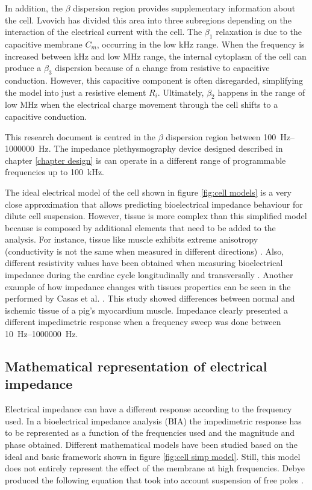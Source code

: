 In addition, the $\beta$ dispersion region provides supplementary information about the cell. Lvovich \cite{lvovich2012impedance} has divided this area into three subregions depending on the interaction of the electrical current with the cell. The $\beta_1$ relaxation is due to the capacitive membrane $C_m$, occurring in the low \si{\kilo\hertz} range. When the frequency is increased between \si{\kilo\hertz} and low \si{\mega\hertz} range, the internal cytoplasm of the cell can produce a $\beta_3$ dispersion because of a change from resistive to capacitive conduction. However, this capacitive component is often disregarded, simplifying the model into just a resistive element $R_i$. Ultimately, $\beta_2$ happens in the range of low \si{\mega\hertz} when the electrical charge movement through the cell shifts to a capacitive conduction.

This research document is centred in the $\beta$ dispersion region between \SIrange[scientific-notation = engineering]{100}{1000000}{\hertz}. The impedance plethysmography device designed described in chapter \ref{chapter design} is can operate in a different range of programmable frequencies up to \SI{100}{\kHz}. 

The ideal electrical model of the cell shown in figure \ref{fig:cell models} is a very close approximation that allows predicting bioelectrical impedance behaviour for dilute cell suspension. However, tissue is more complex than this simplified model because is composed by additional elements that need to be added to the analysis. For instance, tissue like muscle exhibits extreme anisotropy (conductivity is not the same when measured in different directions) \cite{lvovich2012impedance,dean2008electrical,foster1995dielectric}. Also, different resistivity values have been obtained when measuring bioelectrical impedance during the cardiac cycle longitudinally and transversally \cite{steendijk1993four}. Another example of how impedance changes with tissues properties can be seen in the performed by Casas et al. \cite{casas1999vivo}. This study showed differences between normal and ischemic tissue of a pig's myocardium muscle. Impedance clearly presented a different impedimetric response when a frequency sweep was done between \SIrange[scientific-notation = engineering]{10}{1000000}{\hertz}. 

\subsection{Mathematical representation of electrical impedance}
Electrical impedance can have a different response according to the frequency used. In a bioelectrical impedance analysis (BIA) the impedimetric response has to be represented as a function of the frequencies used and the magnitude and phase obtained. Different mathematical models have been studied based on the ideal and basic framework shown in figure \ref{fig:cell simp model}. Still, this model does not entirely represent the effect of the membrane at high frequencies. Debye produced the following equation that took into account suspension of free poles \cite{bertemes2002tissue}.

